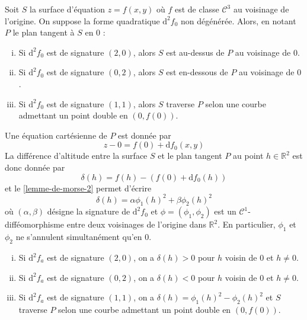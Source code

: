 
	\begin{application}
		Soit $S$ la surface d'équation $z = f(x, y)$ où $f$ est de classe $\mathcal{C}^3$ au voisinage de l'origine. On suppose la forme quadratique $\mathrm{d}^2 f_0$ non dégénérée. Alors, en notant $P$ le plan tangent à $S$ en $0$ :
		\begin{enumerate}[(i)]
			\item Si $\mathrm{d}^2 f_0$ est de signature $(2, 0)$, alors $S$ est au-dessus de $P$ au voisinage de $0$.
			\item Si $\mathrm{d}^2 f_0$ est de signature $(0, 2)$, alors $S$ est en-dessous de $P$ au voisinage de $0$.
			\item Si $\mathrm{d}^2 f_0$ est de signature $(1, 1)$, alors $S$ traverse $P$ selon une courbe admettant un point double en $(0, f(0))$.
		\end{enumerate}
	\end{application}

	\begin{demonstration}
		Une équation cartésienne de $P$ est donnée par
		\[ z - 0 = f(0) + \mathrm{d} f_0(x, y) \]
		La différence d'altitude entre la surface $S$ et le plan tangent $P$ au point $h \in \mathbb{R}^2$ est donc donnée par
		\[ \delta(h) = f(h) - (f(0) + \mathrm{d}f_0(h)) \]
		et le \cref{lemme-de-morse-2} permet d'écrire
		\[ \delta(h) = \alpha \phi_1(h)^2 + \beta \phi_2(h)^2 \]
		où $(\alpha, \beta)$ désigne la signature de $\mathrm{d}^2 f_0$ et $\phi = (\phi_1, \phi_2)$ est un $\mathcal{C}^1$-difféomorphisme entre deux voisinages de l'origine dans $\mathbb{R}^2$. En particulier, $\phi_1$ et $\phi_2$ ne s'annulent simultanément qu'en $0$.
		\begin{enumerate}[(i)]
			\item Si $\mathrm{d}^2 f_a$ est de signature $(2, 0)$, on a $\delta(h) > 0$ pour $h$ voisin de $0$ et $h \neq 0$.
			\item Si $\mathrm{d}^2 f_a$ est de signature $(0, 2)$, on a $\delta(h) < 0$ pour $h$ voisin de $0$ et $h \neq 0$.
			\item Si $\mathrm{d}^2 f_a$ est de signature $(1, 1)$, on a $\delta(h) = \phi_1(h)^2 - \phi_2(h)^2$ et $S$ traverse $P$ selon une courbe admettant un point double en $(0, f(0))$.
		\end{enumerate}
	\end{demonstration}

